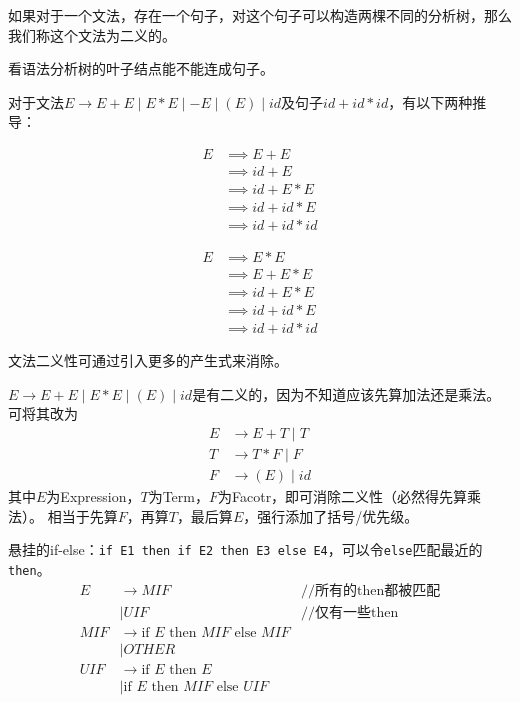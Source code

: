 \begin{definition}[二义性]
如果对于一个文法，存在一个句子，对这个句子可以构造两棵不同的分析树，那么我们称这个文法为二义的。
\end{definition}
看语法分析树的叶子结点能不能连成句子。

\begin{example}
对于文法$E\to E+E\mid E*E\mid -E\mid (E)\mid id$及句子$id+id*id$，有以下两种推导：

\begin{minipage}{0.5\linewidth}
\[\begin{aligned}
E &\implies E+E\\
&\implies id+E\\
&\implies id+E*E\\
&\implies id+id*E\\
&\implies id+id*id
\end{aligned}\]
\end{minipage}
\begin{minipage}{0.5\linewidth}
\[\begin{aligned}
E &\implies E*E\\
&\implies E+E*E\\
&\implies id+E*E\\
&\implies id+id*E\\
&\implies id+id*id
\end{aligned}\]
\end{minipage}
\end{example}

文法二义性可通过引入更多的产生式来消除。
\begin{example}
$E\to E+E\mid E*E\mid (E)\mid id$是有二义的，因为不知道应该先算加法还是乘法。
可将其改为
\[\begin{aligned}
E &\to E+T\mid T\\
T &\to T*F\mid F\\
F &\to (E)\mid id
\end{aligned}\]
其中$E$为Expression，$T$为Term，$F$为Facotr，即可消除二义性（必然得先算乘法）。
相当于先算$F$，再算$T$，最后算$E$，强行添加了括号/优先级。
\end{example}
\begin{example}
悬挂的if-else：\verb'if E1 then if E2 then E3 else E4'，可以令\verb'else'匹配最近的\verb'then'。
\[\begin{array}{rll}
E &\to MIF &\text{//所有的then都被匹配}\\
  &\mid UIF &\text{//仅有一些then}\\
MIF &\to \text{if } E \text{ then } MIF \text{ else } MIF &\\
  &\mid OTHER &\\
UIF &\to \text{if } E \text{ then } E &\\
  &\mid \text{if } E \text{ then } MIF \text{ else } UIF &
\end{array}\]
\end{example}

